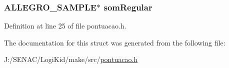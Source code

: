 \hypertarget{struct_ranked_ac648305e0a64500dd62e4b7c34d50943}{
\subsubsection[{som\-Regular}]{\setlength{\rightskip}{0pt plus 5cm}A\-L\-L\-E\-G\-R\-O\-\_\-\-S\-A\-M\-P\-L\-E$\ast$ som\-Regular}}\label{struct_ranked_ac648305e0a64500dd62e4b7c34d50943}


Definition at line 25 of file pontuacao.\-h.



The documentation for this struct was generated from the following file\-:\begin{DoxyCompactItemize}
\item 
J\-:/\-S\-E\-N\-A\-C/\-Logi\-Kid/make/src/\hyperlink{pontuacao_8h}{pontuacao.\-h}\end{DoxyCompactItemize}
